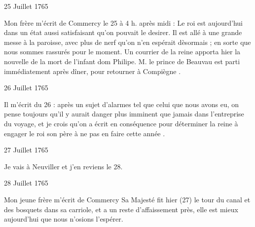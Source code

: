                      \begin{diary}{25 Juillet 1765}{}


                           Mon frère m'écrit de
                              Commercy
                           le 25 à
                           4 h. après midi : \og Le roi
                              est aujourd'hui dans un
                              état aussi satisfaisant qu'on pouvait le desirer.
                              Il est allé à une grande messe à la paroisse,
                              avec plus de nerf qu'on n'en espérait dèsormais ; en sorte que nous sommes rassurés
                              pour le moment.
                              Un courrier de la reine
                              apporta hier la nouvelle
                              de la mort de l'infant dom
                                 Philipe.
                                 M. le prince
                                 de Beauvau est parti immédiatement après dîner,
                              pour retourner à Compiègne \fg{}. \bigskip


                     \end{diary}

                     \begin{diary}{26 Juillet 1765}{}

                         Il m'écrit du 26 : \og après un sujet d'alarmes tel
                              que celui que nous avons eu, on pense toujours
                              qu'il y aurait danger plus imminent que jamais
                              dans l'entreprise du voyage, et je crois qu'on a
                              écrit en conséquence pour déterminer la reine
                              à engager le roi son
                                 père à ne pas en faire cette
                              année \fg{}. \bigskip


                     \end{diary}

                     \begin{diary}{27 Juillet 1765}{}

                         Je vais à Neuviller et j'en reviens le
                              28. \bigskip


                     \end{diary}

                     \begin{diary}{28 Juillet 1765}{}


                           Mon jeune frère m'écrit
                           de Commercy
                           \og Sa Majesté
                              fit hier (27) le tour du canal et
                              des bosquets dans
                              sa carriole, et a un reste d'affaissement près,
                              elle est mieux aujourd'hui que nous n'osions
                              l'espérer. \fg{}
                        \bigskip


                     \end{diary}

